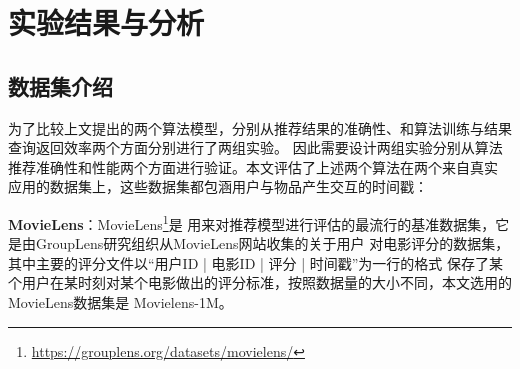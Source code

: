 ﻿%
\chapter{实验结果与分析}

\section{数据集介绍}

为了比较上文提出的两个算法模型，分别从推荐结果的准确性、和算法训练与结果查询返回效率两个方面分别进行了两组实验。%
因此需要设计两组实验分别从算法推荐准确性和性能两个方面进行验证。本文评估了上述两个算法在两个来自真实%
应用的数据集上，这些数据集都包涵用户与物品产生交互的时间戳：

\textbf{MovieLens}：MovieLens\footnote{\url{https://grouplens.org/datasets/movielens/}}是%
用来对推荐模型进行评估的最流行的基准数据集，它是由GroupLens研究组织从MovieLens网站收集的关于用户%
对电影评分的数据集，其中主要的评分文件以“用户ID | 电影ID | 评分 | 时间戳”为一行的格式%
保存了某个用户在某时刻对某个电影做出的评分标准，按照数据量的大小不同，本文选用的MovieLens数据集是%
Movielens-1M。

